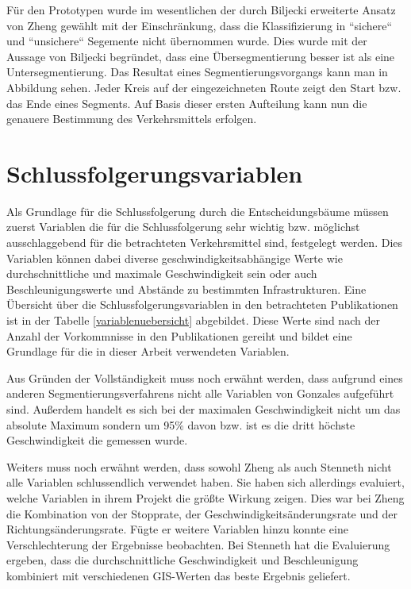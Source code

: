 Für den Prototypen wurde im wesentlichen der durch Biljecki erweiterte Ansatz von Zheng gewählt mit der Einschränkung, dass die Klassifizierung in ``sichere`` und ``unsichere`` Segemente nicht übernommen wurde. Dies wurde mit der Aussage von Biljecki begründet, dass eine Übersegmentierung besser ist als eine Untersegmentierung. Das Resultat eines Segmentierungsvorgangs kann man in Abbildung  sehen. Jeder Kreis auf der eingezeichneten Route zeigt den Start bzw. das Ende eines Segments. Auf Basis dieser ersten Aufteilung kann nun die genauere Bestimmung des Verkehrsmittels erfolgen.

\clearpage

\section{Schlussfolgerungsvariablen}
\label{schlussfolgerungsvariablen}
Als Grundlage für die Schlussfolgerung durch die Entscheidungsbäume müssen zuerst Variablen die für die Schlussfolgerung sehr wichtig bzw. möglichst ausschlaggebend für die betrachteten Verkehrsmittel sind, festgelegt werden. Dies Variablen können dabei diverse geschwindigkeitsabhängige Werte wie durchschnittliche und maximale Geschwindigkeit sein oder auch Beschleunigungswerte und  Abstände zu bestimmten Infrastrukturen. Eine Übersicht über die Schlussfolgerungsvariablen in den betrachteten Publikationen ist in der Tabelle \ref{variablenuebersicht} abgebildet. Diese Werte sind nach der Anzahl der Vorkommnisse in den Publikationen gereiht und bildet eine Grundlage für die in dieser Arbeit verwendeten Variablen. 

Aus Gründen der Vollständigkeit muss noch erwähnt werden, dass aufgrund eines anderen Segmentierungsverfahrens nicht alle Variablen von Gonzales  \cite{gonzalez_automating_2010} aufgeführt sind. Außerdem handelt es sich bei der maximalen Geschwindigkeit nicht um das absolute Maximum sondern um 95\% davon bzw. ist es die dritt höchste Geschwindigkeit die gemessen wurde. 

Weiters muss noch erwähnt werden, dass sowohl Zheng  \cite{zheng_understanding_2010} als auch Stenneth \cite{stenneth_transportation_2011} nicht alle Variablen schlussendlich verwendet haben. Sie haben sich allerdings evaluiert, welche Variablen in ihrem Projekt die größte Wirkung zeigen. Dies war bei Zheng \cite{zheng_understanding_2010} die Kombination von der Stopprate, der Geschwindigkeitsänderungsrate und der Richtungsänderungsrate. Fügte er weitere Variablen hinzu konnte eine Verschlechterung der Ergebnisse beobachten. Bei Stenneth \cite{stenneth_transportation_2011} hat die Evaluierung ergeben, dass die durchschnittliche Geschwindigkeit und Beschleunigung kombiniert mit verschiedenen GIS-Werten das beste Ergebnis geliefert. 

